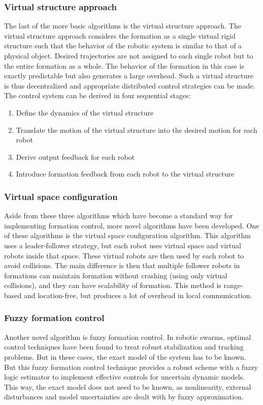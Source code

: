 \subsubsection{Virtual structure approach}
The last of the more basic algorithms is the virtual structure approach. 
The virtual structure approach considers the formation as a single virtual rigid structure such that the behavior of the robotic system is similar to that of a physical object. 
Desired trajectories are not assigned to each single robot but to the entire formation as a whole. 
The behavior of the formation in this case is exactly predictable but also generates a  large overhead. \cite{consolini2008leader}
Such a virtual structure is thus decentralized and appropriate distributed control strategies can be made. \cite{ren2004decentralized}
The control system can be derived in four sequential stages: \cite{do2007nonlinear}
\begin{enumerate}
	\item Define the dynamics of the virtual structure 
	\item Translate the motion of the virtual structure into the desired motion for each robot
	\item Derive output feedback for each robot
	\item Introduce formation feedback from each robot to the virtual structure
\end{enumerate} 

\subsubsection{Virtual space configuration}
Aside from these three algorithms which have become a standard way for implementing formation control, more novel algorithms have been developed. 
One of these algorithms is the virtual space configuration algorithm. \cite{wee2013formation}
This algorithm uses a leader-follower strategy, but each robot uses virtual space and virtual robots inside that space.
These virtual robots are then used by each robot to avoid collisions. 
The main difference is then that multiple follower robots in formations can maintain formation without crashing (using only virtual collisions), and they can have scalability of formation. 
This method is range-based and location-free, but produces a lot of overhead in local communication.

\subsubsection{Fuzzy formation control}
Another novel algorithm is fuzzy formation control.\cite{ranjbar2012novel}
In robotic swarms, optimal control techniques have been found to treat robust stabilization and tracking problems. 
But in these cases, the exact model of the system has to be known. 
But this fuzzy formation control technique provides a robust scheme with a fuzzy logic estimator to implement effective controls for uncertain dynamic models.
This way, the exact model does not need to be known, as nonlinearity, external disturbances and model uncertainties are dealt with by fuzzy approximation.

